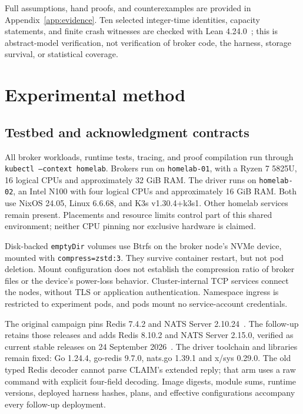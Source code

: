 \documentclass[11pt]{article}
\theoremstyle{definition}
\newcommand{\code}[1]{\texttt{#1}}
\begin{document}
Full assumptions, hand proofs, and counterexamples are provided in Appendix~\ref{app:evidence}. Ten selected integer-time identities, capacity statements, and finite crash witnesses are checked with Lean 4.24.0~\cite{demoura2021lean4,lean424release}; this is abstract-model verification, not verification of broker code, the harness, storage survival, or statistical coverage.

\section{Experimental method}\label{sec:method}

\subsection{Testbed and acknowledgment contracts}

All broker workloads, runtime tests, tracing, and proof compilation run through \code{kubectl --context homelab}. Brokers run on \code{homelab-01}, with a Ryzen 7 5825U, 16 logical CPUs and approximately 32 GiB RAM. The driver runs on \code{homelab-02}, an Intel N100 with four logical CPUs and approximately 16 GiB RAM. Both use NixOS 24.05, Linux 6.6.68, and K3s v1.30.4+k3s1. Other homelab services remain present. Placements and resource limits control part of this shared environment; neither CPU pinning nor exclusive hardware is claimed.

Disk-backed \code{emptyDir} volumes use Btrfs on the broker node's NVMe device, mounted with \code{compress=zstd:3}. They survive container restart, but not pod deletion. Mount configuration does not establish the compression ratio of broker files or the device's power-loss behavior. Cluster-internal TCP services connect the nodes, without TLS or application authentication. Namespace ingress is restricted to experiment pods, and pods mount no service-account credentials.

The original campaign pins Redis 7.4.2 and NATS Server 2.10.24~\cite{redis742release,nats21024release}. The follow-up retains those releases and adds Redis 8.10.2 and NATS Server 2.15.0, verified as current stable releases on 24 September 2026~\cite{redis8102release,nats2150release}. The driver toolchain and libraries remain fixed: Go 1.24.4, go-redis 9.7.0, nats.go 1.39.1 and x/sys 0.29.0. The old typed Redis decoder cannot parse CLAIM's extended reply; that arm uses a raw command with explicit four-field decoding. Image digests, module sums, runtime versions, deployed harness hashes, plans, and effective configurations accompany every follow-up deployment.
\end{document}
